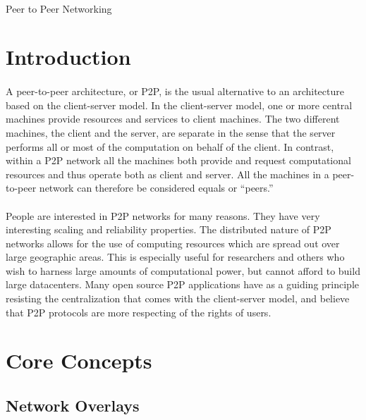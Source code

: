 \documentclass[12pt,letterpaper]{article}
\begin{document}
\onehalfspacing

\paragraph{}
\begin{center}
\Large Peer to Peer Networking
\end{center}

\section{Introduction}

\paragraph{}
A peer-to-peer architecture, or P2P, is the usual alternative to an architecture based on the client-server model.
In the client-server model, one or more central machines provide resources and services to client machines.
The two different machines, the client and the server, are separate in the sense that the server performs all or most of the computation on behalf of the client.
In contrast, within a P2P network all the machines both provide and request computational resources and thus operate both as client and server.
All the machines in a peer-to-peer network can therefore be considered equals or ``peers.''

\paragraph{}
People are interested in P2P networks for many reasons.
They have very interesting scaling and reliability properties.
The distributed nature of P2P networks allows for the use of computing resources which are spread out over large geographic areas.
This is especially useful for researchers and others who wish to harness large amounts of computational power, but cannot afford to build large datacenters.
Many open source P2P applications have as a guiding principle resisting the centralization that comes with the client-server model, and believe that P2P protocols are more respecting of the rights of users.

\section{Core Concepts}

\subsection{Network Overlays}
\end{document}
